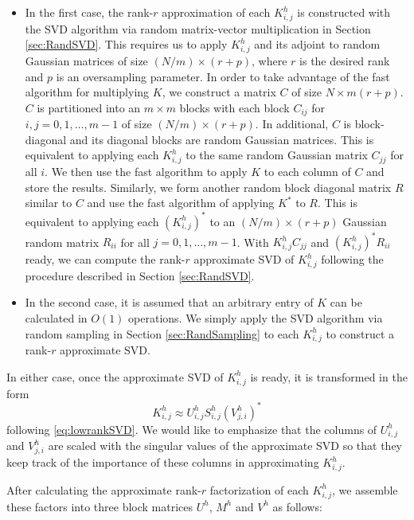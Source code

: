 \begin{itemize}
\item In the first case, the rank-$r$ approximation of each $K^h_{i,j}$ is constructed with the SVD algorithm via random matrix-vector multiplication in Section \ref{sec:RandSVD}. This requires us to apply $K^h_{i,j}$ and its adjoint to random Gaussian matrices of size $(N/m)\times(r+p)$, where $r$ is the desired rank and $p$ is an oversampling parameter. In order to take advantage of the fast algorithm for multiplying $K$, we construct a matrix $C$ of size $N \times m(r+p)$. $C$ is partitioned into an $m\times m$ blocks with each block $C_{ij}$ for $i,j=0,1,\dots,m-1$ of size
  $(N/m)\times (r+p)$. In additional, $C$ is block-diagonal and its diagonal blocks are random Gaussian matrices.  This is equivalent to applying each $K^h_{i,j}$ to the same random Gaussian matrix $C_{jj}$ for all $i$. We then use the fast algorithm to apply $K$ to each column of $C$ and store the results. Similarly, we form another random block diagonal matrix $R$ similar to $C$ and use the fast algorithm of applying $K^*$ to $R$. This is equivalent to applying each $(K^h_{i,j})^*$ to an $(N/m)\times (r+p)$ Gaussian random matrix $R_{ii}$ for all $j=0,1,\ldots, m-1$. With $K^h_{i,j}C_{jj}$ and $(K^h_{i,j})^*R_{ii}$ ready, we can compute the rank-$r$ approximate SVD of $K^h_{i,j}$ following the procedure described in Section
  \ref{sec:RandSVD}.
\item In the second case, it is assumed that an arbitrary entry of $K$ can be calculated in $O(1)$ operations. We simply apply the SVD algorithm via random sampling in Section \ref{sec:RandSampling} to each $K^h_{i,j}$ to construct a rank-$r$ approximate SVD.
\end{itemize}

In either case, once the approximate SVD of $K^h_{i,j}$ is ready, it is transformed in the form
\[
K^h_{i,j} \approx U^h_{i,j}S^h_{i,j}(V^h_{j,i})^*
\]
following \eqref{eq:lowrankSVD}. We would like to emphasize that the columns of $U^h_{i,j}$ and $V^h_{j,i}$ are scaled with the singular values of the approximate SVD so that they keep track of the importance of these columns in approximating $K^h_{i,j}$.

After calculating the approximate rank-$r$ factorization of each $K^h_{i,j}$, we assemble these factors into three block matrices $U^h$, $M^h$ and $V^h$ as follows:

